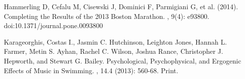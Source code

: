 \documentclass[twoside]{article}
\begin{document}
\begin{multicols}{2}

\begin{thebibliography}{99} %


Hammerling D, Cefalu M, Cisewski J, Dominici F, Parmigiani G, et al. (2014).
\newblock Completing the Results of the 2013 Boston Marathon. 
, 9(4): e93800. doi:10.1371/journal.pone.0093800

Karageorghis, Costas I., Jasmin C. Hutchinson, Leighton Jones, Hannah L. Farmer, Metin S. Ayhan, Rachel C. Wilson, Joshua Rance, Christopher J. Hepworth, and Stewart G. Bailey. 
\newblock Psychological, Psychophysical, and Ergogenic Effects of Music in Swimming. 
, 14.4 (2013): 560-68. Print.
 
\end{thebibliography}


\end{multicols}
\end{document}
